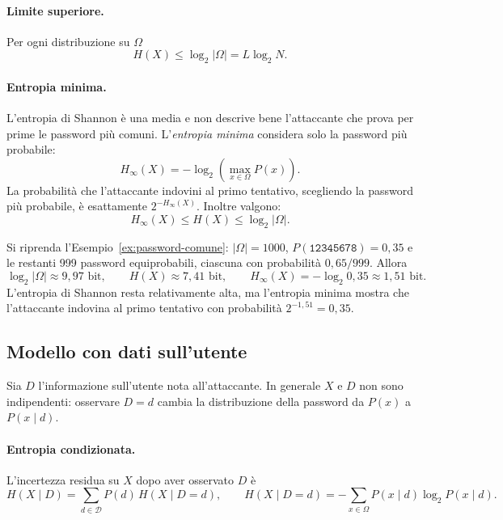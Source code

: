 \paragraph{Limite superiore.}
Per ogni distribuzione su \(\Omega\)
\[
    H(X) \leq \log_2 \vert\Omega\vert = L \log_2 N.
\]

\paragraph{Entropia minima.}
L'entropia di Shannon è una media e non descrive bene l'attaccante che prova per prime le password più comuni. L'\emph{entropia minima} considera solo la password più probabile:
\[
    \boxed{
        H_{\infty}(X) = -\log_2 \left( \max_{x \in \Omega} P(x) \right).
    }
\]
La probabilità che l'attaccante indovini al primo tentativo, scegliendo la password più probabile, è esattamente \(2^{-H_{\infty}(X)}\). Inoltre valgono:
\[
    H_{\infty}(X) \leq H(X) \leq \log_2 \vert\Omega\vert.
\]

\begin{example}
    Si riprenda l'Esempio~\ref{ex:password-comune}: \(\vert\Omega\vert = 1000\), \(P(\texttt{12345678}) = 0{,}35\) e le restanti 999 password equiprobabili, ciascuna con probabilità \(0{,}65/999\). Allora
    \[
        \log_2 \vert\Omega\vert \approx 9{,}97 \text{ bit}, \qquad
        H(X) \approx 7{,}41 \text{ bit}, \qquad
        H_{\infty}(X) = -\log_2 0{,}35 \approx 1{,}51 \text{ bit}.
    \]
    L'entropia di Shannon resta relativamente alta, ma l'entropia minima mostra che l'attaccante indovina al primo tentativo con probabilità \(2^{-1{,}51} = 0{,}35\).
\end{example}

\subsection{Modello con dati sull'utente}\label{app:ModelloDati}
Sia \(D\) l'informazione sull'utente nota all'attaccante. In generale \(X\) e \(D\) non sono indipendenti: osservare \(D = d\) cambia la distribuzione della password da \(P(x)\) a \(P(x \mid d)\).

\paragraph{Entropia condizionata.}
L'incertezza residua su \(X\) dopo aver osservato \(D\) è
\[
    H(X \mid D) = \sum_{d \in \mathcal{D}} P(d) \, H(X \mid D = d),
    \qquad
    H(X \mid D = d) = -\sum_{x \in \Omega} P(x \mid d) \log_2 P(x \mid d).
\]

